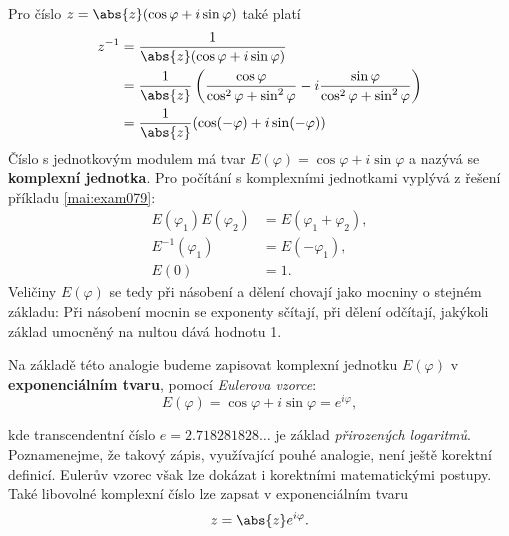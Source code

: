       Pro číslo \(z = \abs{z}(\cos\varphi+ i\sin\varphi)\) také platí
      \begin{gather*}
        \begin{align*}
          z^{-1} &= \dfrac{1}{\abs{z}(\cos\varphi+ i\sin\varphi)}                  \\
                &= \dfrac{1}{\abs{z}}
                    \left(\dfrac{\cos\varphi}{\cos^2\varphi + \sin^2\varphi}
                        -i\dfrac{\sin\varphi}{\cos^2\varphi + \sin^2\varphi}\right) \\
                &= \dfrac{1}{\abs{z}}(\cos(-\varphi)+ i\sin(-\varphi))
        \end{align*}
      \end{gather*}
      Číslo s jednotkovým modulem má tvar \(E(\varphi) = \cos\varphi+i\sin\varphi\) a nazývá se 
      \textbf{komplexní jednotka}. Pro počítání s komplexními jednotkami vyplývá z řešení příkladu 
      \ref{mai:exam079}:
      \begin{subequations}
        \begin{align}\label{mai:eq75}
          E(\varphi_1)E(\varphi_2) &= E(\varphi_1 + \varphi_2), \\  
                 E^{-1}(\varphi_1) &= E(-\varphi_1),            \\
                              E(0) &= 1.
        \end{align}
      \end{subequations}
      Veličiny \(E(\varphi)\) se tedy při násobení a dělení chovají jako mocniny o stejném základu: 
      Při násobení mocnin se exponenty sčítají, při dělení odčítají, jakýkoli základ umocněný na 
      nultou dává hodnotu \num{1}. 
      \begin{mdframed}[style=highlight]
        Na základě této analogie budeme zapisovat komplexní jednotku \(E(\varphi)\) v 
        \textbf{exponenciálním tvaru}, pomocí \emph{Eulerova vzorce}:
        \begin{equation}\label{mai:eq76}
          E(\varphi) = \cos\varphi+ i\sin\varphi = e^{i\varphi},
        \end{equation}
      \end{mdframed}
      kde transcendentní číslo \(e = \num{2.718 281828}\ldots\) je základ \emph{přirozených 
      logaritmů}. Poznamenejme, že takový zápis, využívající pouhé analogie, není ještě korektní 
      definicí. Eulerův vzorec však lze dokázat i korektními matematickými postupy. Také libovolné 
      komplexní číslo lze zapsat v exponenciálním tvaru 
      \begin{equation}\label{mai:eq77}
        z = \abs{z}e^{i\varphi}.
      \end{equation}
        
